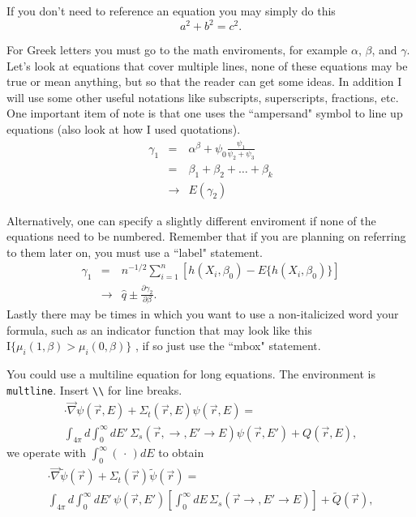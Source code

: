 If you don't need to reference an equation you may simply do this 
\[
  a^2 + b^2 = c^2.
\]

For Greek letters you must go to the math enviroments, for example 
$\alpha$, $\beta$, and $\gamma$.  Let's look at equations that cover 
multiple lines, none of these equations may be true or mean anything, but so 
that the reader can get some ideas.  In addition I will use some other useful 
notations like subscripts, superscripts, fractions, etc.  One important item 
of note is that one uses the ``ampersand" symbol to line up equations 
(also look at how I used quotations).
%
\begin{eqnarray}
\gamma_1 & = & \alpha^{\beta} + \psi_0 \frac{\psi_1}{\psi_2+\psi_3} \label{eq.two} \\
& = & \beta_1 + \beta_2 + \ldots + \beta_k \nonumber\\
& \rightarrow & E(\gamma_2) 
\end{eqnarray}

Alternatively, one can specify a slightly different enviroment if none of 
the equations need to be numbered.  Remember that if you are planning on 
referring to them later on, you must use a ``label" statement.
%
\begin{eqnarray*}
\gamma_1 & = & n^{-1/2} \displaystyle \sum_{i=1}^n \left[h(X_i,\beta_0)-E\{h(X_i,\beta_0)\}\right]\\
& \rightarrow & \hat q \pm \frac{\partial \gamma_2}{\partial \beta}. 
\end{eqnarray*}  
Lastly there may be times in which you want to use a non-italicized word 
your formula, such as an indicator function that may look like this 
$\mbox{I}\{\mu_i(1,\beta)>\mu_i(0,\beta)\}$ , if so just use the 
``mbox" statement.


You could use a multiline equation for long equations.  The environment
is \texttt{multline}.  Insert \verb^\\^ for line breaks.
\begin{multline*}
  \cdot \vec{\nabla} \psi(\vec{r},E)
   + \Sigma_t(\vec{r},E)\psi(\vec{r},E) = \\
  \int_{4\pi} d \int_0^{\infty} dE' \, 
  \Sigma_s(\vec{r},\to,E'\to E)\psi(\vec{r},E')
  + Q(\vec{r},E),
\end{multline*}
we operate with $\displaystyle\int_{0}^{\infty}\left(\,\cdot\,\right) dE$
to obtain
\begin{multline*}
  \cdot \vec{\nabla} \tilde{\psi}(\vec{r})
  + \Sigma_t(\vec{r})\tilde{\psi}(\vec{r}) = \\
  \int_{4\pi} d \int_0^{\infty} dE' \, \psi(\vec{r},E')
  \left [ \int_{0}^{\infty} dE \, \Sigma_s(\vec{r}\to,E'\to E)
  \right ] + \tilde{Q}(\vec{r}),
\end{multline*}
